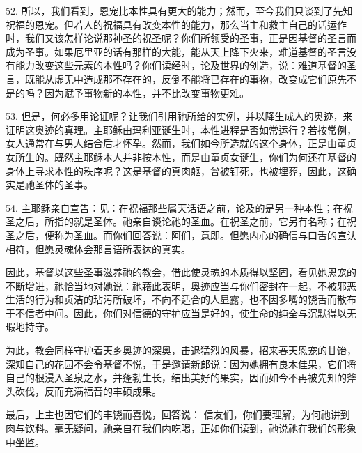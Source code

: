 52. 所以，我们看到，恩宠比本性具有更大的能力；然而，至今我们只谈到了先知祝福的恩宠。但若人的祝福具有改变本性的能力，那么当主和救主自己的话运作时，我们又该怎样论说那神圣的祝圣呢？你们所领受的圣事，正是因基督的圣言而成为圣事。如果厄里亚的话有那样的大能，能从天上降下火来，难道基督的圣言没有能力改变这些元素的本性吗？你们读经时，论及世界的创造，说：难道基督的圣言，既能从虚无中造成那不存在的，反倒不能将已存在的事物，改变成它们原先不是的吗？因为赋予事物新的本性，并不比改变事物更难。\par

53. 但是，何必多用论证呢？让我们引用祂所给的实例，并以降生成人的奥迹，来证明这奥迹的真理。主耶稣由玛利亚诞生时，本性进程是否如常运行？若按常例，女人通常在与男人结合后才怀孕。然而，我们如今所造就的这个身体，正是由童贞女所生的。既然主耶稣本人并非按本性，而是由童贞女诞生，你们为何还在基督的身体上寻求本性的秩序呢？这是基督的真肉躯，曾被钉死，也被埋葬，因此，这确实是祂圣体的圣事。\par

54. 主耶稣亲自宣告：见：在祝福那些属天话语之前，论及的是另一种本性；在祝圣之后，所指的就是圣体。祂亲自谈论祂的圣血。在祝圣之前，它另有名称；在祝圣之后，便称为圣血。而你们回答说：阿们，意即。但愿内心的确信与口舌的宣认相符，但愿灵魂体会那言语所表达的真实。\par

因此，基督以这些圣事滋养祂的教会，借此使灵魂的本质得以坚固，看见她恩宠的不断增进，祂恰当地对她说：祂藉此表明，奥迹应当与你们密封在一起，不被邪恶生活的行为和贞洁的玷污所破坏，不向不适合的人显露，也不因多嘴的饶舌而散布于不信者中间。因此，你们对信德的守护应当是好的，使生命的纯全与沉默得以无瑕地持守。\par

为此，教会同样守护着天乡奥迹的深奥，击退猛烈的风暴，招来春天恩宠的甘饴，深知自己的花园不会令基督不悦，于是邀请新郎说：因为她拥有良木佳果，它们将自己的根浸入圣泉之水，并蓬勃生长，结出美好的果实，因而如今不再被先知的斧头砍伐，反而充满福音的丰硕成果。\par

最后，上主也因它们的丰饶而喜悦，回答说： 信友们，你们要理解，为何祂讲到肉与饮料。毫无疑问，祂亲自在我们内吃喝，正如你们读到，祂说祂在我们的形象中坐监。\par

